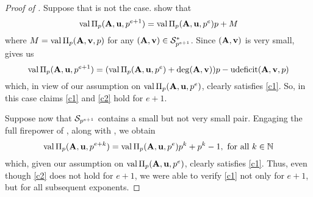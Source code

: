 \documentclass{article}
\begin{document}
\begin{proof}[Proof of ]
   Suppose that is not the case.
    show that
   \begin{equation}
      \label{recurrence: E}
      \val \IP_p(\matA,\vv{u},p^{e+1}) = \val \IP_p(\matA,\vv{u},p^e)p + M
   \end{equation}
   where $M = \val\IP_p(\matA,\vv{v},p)$ for any  $(\matA,\vv{v}) \in \S^*_{p^{e+1}}$.
   Since $(\matA,\vv{v})$ is very small,  gives us
   \[\val \IP_p(\matA,\vv{u},p^{e+1}) = (\val \IP_p(\matA,\vv{u},p^e) + \degree(\matA,\vv{v})) p - \udeficit(\matA,\vv{v},p)\]
   which, in view of our assumption on $\val \IP_p(\matA,\vv{u},p^e)$, clearly satisfies \ref{c1}.
   So, in this case claims \ref{c1} and \ref{c2} hold for $e+1$.

   Suppose now that $\S_{p^{e+1}}$ contains a small but not very small pair.
   Engaging the full firepower of , along with , we obtain
   \begin{equation}
      \label{tail: E}
      \val \IP_p(\matA,\vv{u},p^{e+k}) = \val \IP_p(\matA,\vv{u},p^e)p^k + p^k - 1,\text{ for all }k\in \NN
   \end{equation}
   which, given our assumption on $\val \IP_p(\matA,\vv{u},p^e)$, clearly satisfies \ref{c1}.
   Thus, even though \ref{c2} does not hold for $e+1$, we were able to verify \ref{c1} not only for $e+1$, but for all subsequent exponents.
\end{proof}
\end{document}
